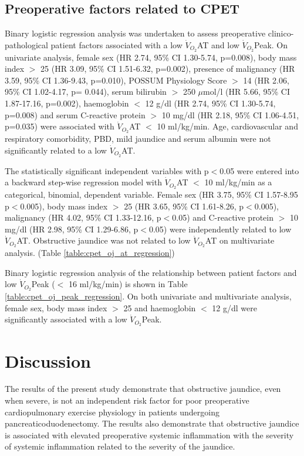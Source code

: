 \subsection{Preoperative factors related to CPET}
Binary logistic regression analysis was undertaken to assess preoperative clinico-pathological patient factors associated with a low $\dot{V}_{O_2}$AT and low $\dot{V}_{O_2}$Peak. 
On univariate analysis, female sex (HR 2.74, 95\% CI 1.30-5.74, p=0.008), body mass index $>$ 25 (HR 3.09, 95\% CI 1.51-6.32, p=0.002), presence of malignancy (HR 3.59, 95\% CI 1.36-9.43, p=0.010), POSSUM Physiology Score $>$ 14 (HR 2.06, 95\% CI 1.02-4.17, p= 0.044), serum bilirubin $>$ 250 $\mu$mol/l (HR 5.66, 95\% CI 1.87-17.16, p=0.002), haemoglobin $<$ 12 g/dl (HR 2.74, 95\% CI 1.30-5.74, p=0.008) and serum C-reactive protein $>$ 10 mg/dl (HR 2.18, 95\% CI 1.06-4.51, p=0.035) were associated with $\dot{V}_{O_2}$AT $<$ 10 ml/kg/min. 
Age, cardiovascular and respiratory comorbidity, PBD, mild jaundice and serum albumin were not significantly related to a low $\dot{V}_{O_2}$AT. 

The statistically significant independent variables with p$<$0.05 were entered into a backward step-wise regression model with $\dot{V}_{O_2}$AT $<$ 10 ml/kg/min as a categorical, binomial, dependent variable. 
Female sex (HR 3.75, 95\% CI 1.57-8.95 p$<$0.005), body mass index $>$ 25 (HR 3.65, 95\% CI 1.61-8.26, p$<$0.005), malignancy (HR 4.02, 95\% CI 1.33-12.16, p$<$0.05) and C-reactive protein $>$ 10 mg/dl (HR 2.98, 95\% CI 1.29-6.86, p$<$0.05) were independently related to low $\dot{V}_{O_2}$AT. 
Obstructive jaundice was not related to low $\dot{V}_{O_2}$AT on multivariate analysis. (Table \ref{table:cpet_oj_at_regression})

Binary logistic regression analysis of the relationship between patient factors and low $\dot{V}_{O_2}$Peak ($<$ 16 ml/kg/min) is shown in Table \ref{table:cpet_oj_peak_regression}. 
On both univariate and multivariate analysis, female sex, body mass index $>$ 25 and haemoglobin $<$ 12 g/dl were significantly associated with a low $\dot{V}_{O_2}$Peak. 




\clearpage

\section{Discussion}

The results of the present study demonstrate that obstructive jaundice, even when severe, is not an independent risk factor for poor preoperative cardiopulmonary exercise physiology in patients undergoing pancreaticoduodenectomy. 
The results also demonstrate that obstructive jaundice is associated with elevated preoperative systemic inflammation with the severity of systemic inflammation related to the severity of the jaundice.

